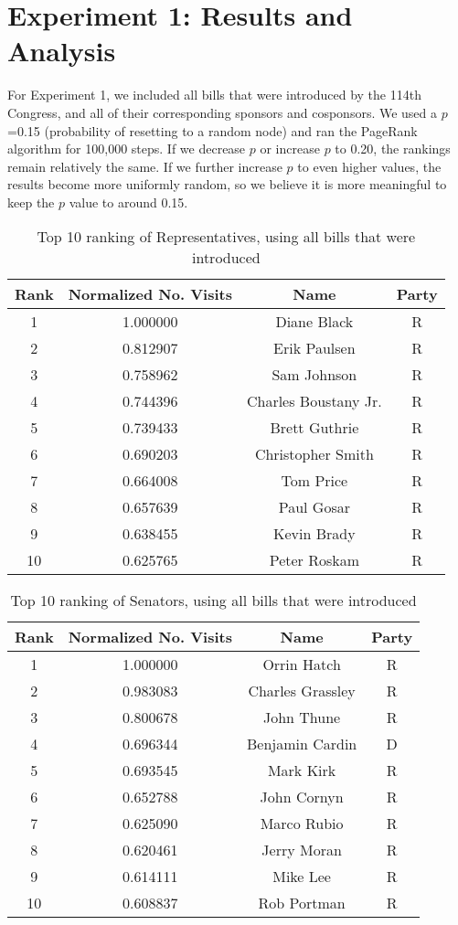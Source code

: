 \documentclass[11pt]{article}
\begin{document}
\section*{Experiment 1: Results and Analysis}
For Experiment 1, we included all bills that were introduced by the 114th Congress, and all of their corresponding sponsors and cosponsors. We used a $p$=0.15 (probability of resetting to a random node) and ran the PageRank algorithm for 100,000 steps. If we decrease $p$ or increase $p$ to 0.20, the rankings remain relatively the same. If we further increase $p$ to even higher values, the results become more uniformly random, so we believe it is more meaningful to keep the $p$ value to around 0.15. 


\begin{table}[h!]
\centering
 \begin{tabular}{|c | c |c |c|} 
 \hline
 Rank & Normalized No. Visits & Name & Party \\ [0.5ex] 
 \hline
1  & 1.000000 & Diane Black & R \\
2  & 0.812907 & Erik Paulsen & R \\
3  & 0.758962 & Sam Johnson & R \\
4  & 0.744396 & Charles Boustany Jr. & R \\
5  & 0.739433 & Brett Guthrie & R \\
6  & 0.690203 & Christopher Smith & R \\
7  & 0.664008 & Tom Price & R \\
8  & 0.657639 & Paul Gosar & R \\
9  & 0.638455 & Kevin Brady & R \\
10 &  0.625765 &  Peter Roskam & R \\
 \hline
 
\end{tabular}
\caption{Top 10 ranking of Representatives, using all bills that were introduced}
\label{table:experiment1}
\end{table}

\begin{table}[h!]
\centering
 \begin{tabular}{|c | c |c |c|} 
 \hline
 Rank & Normalized No. Visits & Name & Party \\ [0.5ex] 
 \hline
1  & 1.000000 & Orrin Hatch &R\\
2  & 0.983083 & Charles Grassley &R\\
3  & 0.800678 & John Thune &R\\
4  & 0.696344  & Benjamin Cardin & D\\
5  & 0.693545  & Mark Kirk & R\\
6  & 0.652788  & John Cornyn & R\\
7  & 0.625090  & Marco Rubio & R\\
8  & 0.620461  & Jerry Moran & R\\
9  & 0.614111  & Mike Lee & R\\
10 &  0.608837 &  Rob Portman & R\\
 \hline
 
\end{tabular}
\caption{Top 10 ranking of Senators, using all bills that were introduced}
\label{table:experiment1_2}
\end{table}
\end{document}
